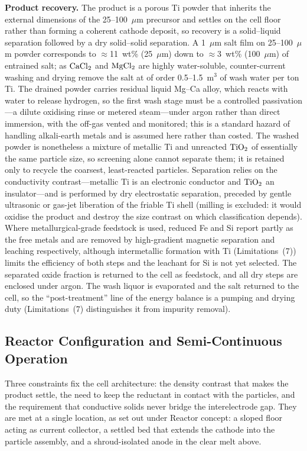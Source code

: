 \documentclass[pdflatex,sn-basic,Numbered]{sn-jnl}
\begin{document}
\textbf{Product recovery.} The product is a porous Ti powder that inherits the external dimensions of the 25--100~$\mu$m precursor and settles on the cell floor rather than forming a coherent cathode deposit, so recovery is a solid--liquid separation followed by a dry solid--solid separation. A 1~$\mu$m salt film on 25--100~$\mu$m powder corresponds to $\approx$11~wt\% (25~$\mu$m) down to $\approx$3~wt\% (100~$\mu$m) of entrained salt; as $\ce{CaCl2}$ and $\ce{MgCl2}$ are highly water-soluble, counter-current washing and drying remove the salt at of order 0.5--1.5~m$^3$ of wash water per ton Ti. The drained powder carries residual liquid Mg--Ca alloy, which reacts with water to release hydrogen, so the first wash stage must be a controlled passivation---a dilute oxidising rinse or metered steam---under argon rather than direct immersion, with the off-gas vented and monitored; this is a standard hazard of handling alkali-earth metals and is assumed here rather than costed. The washed powder is nonetheless a mixture of metallic Ti and unreacted $\ce{TiO2}$ of essentially the same particle size, so screening alone cannot separate them; it is retained only to recycle the coarsest, least-reacted particles. Separation relies on the conductivity contrast---metallic Ti is an electronic conductor and $\ce{TiO2}$ an insulator---and is performed by dry electrostatic separation, preceded by gentle ultrasonic or gas-jet liberation of the friable Ti shell (milling is excluded: it would oxidise the product and destroy the size contrast on which classification depends). Where metallurgical-grade feedstock is used, reduced Fe and Si report partly as the free metals and are removed by high-gradient magnetic separation and leaching respectively, although intermetallic formation with Ti (Limitations~(7)) limits the efficiency of both steps and the leachant for Si is not yet selected. The separated oxide fraction is returned to the cell as feedstock, and all dry steps are enclosed under argon. The wash liquor is evaporated and the salt returned to the cell, so the ``post-treatment'' line of the energy balance is a pumping and drying duty (Limitations~(7) distinguishes it from impurity removal).

\subsection{Reactor Configuration and Semi-Continuous Operation}

Three constraints fix the cell architecture: the density contrast that makes the product settle, the need to keep the reductant in contact with the particles, and the requirement that conductive solids never bridge the interelectrode gap. They are met at a single location, as set out under Reactor concept: a sloped floor acting as current collector, a settled bed that extends the cathode into the particle assembly, and a shroud-isolated anode in the clear melt above.
\end{document}
